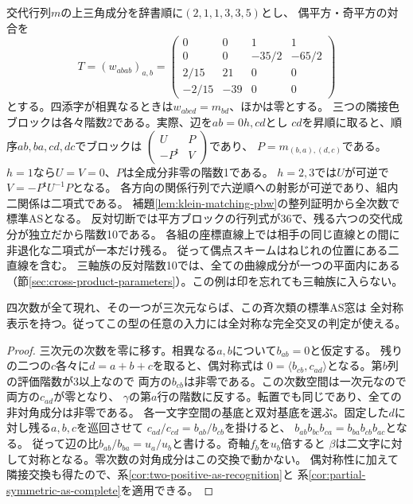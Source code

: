 \begin{proposition}[三軸族の外の反対階数10]\label{ex:klein-matched-rank-ten}
交代行列$m$の上三角成分を辞書順に$(2,1,1,3,3,5)$とし、
偶平方・奇平方の対合を
\[
 T=(w_{abab})_{a,b}=
 \begin{pmatrix}0&0&1&1\\0&0&-35/2&-65/2\\
 2/15&21&0&0\\-2/15&-39&0&0\end{pmatrix}
\]
とする。四添字が相異なるときは$w_{abcd}=m_{bd}$、ほかは零とする。
三つの隣接色ブロックは各々階数2である。実際、辺を$ab=0h,cd$とし
$cd$を昇順に取ると、順序$ab,ba,cd,dc$でブロックは
$\left(\begin{smallmatrix}U&P\\-P^{\mathsf t}&V\end{smallmatrix}\right)$であり、
$P=m_{(b,a),(d,c)}$である。$h=1$なら$U=V=0$、$P$は全成分非零の階数1である。
$h=2,3$では$U$が可逆で$V=-P^{\mathsf t}U^{-1}P$となる。
各方向の関係行列で六逆順への射影が可逆であり、組内二関係は二項式である。
補題\ref{lem:klein-matching-pbw}の整列証明から全次数で標準ASとなる。
反対切断では平方ブロックの行列式が36で、残る六つの交代成分が独立だから階数10である。
各組の座標直線上では相手の同じ直線との間に非退化な二項式が一本だけ残る。
従って偶点スキームはねじれの位置にある二直線を含む。
三軸族の反対階数10では、全ての曲線成分が一つの平面内にある
（節\ref{sec:cross-product-parameters}）。この例は印を忘れても三軸族に入らない。
\end{proposition}

\begin{proposition}\label{prop:klein-three-singletons}
四次数が全て現れ、その一つが三次元ならば、この斉次類の標準AS窓は
全対称表示を持つ。従ってこの型の任意の入力には全対称な完全交叉の判定が使える。
\end{proposition}
\begin{proof}
三次元の次数を零に移す。相異なる$a,b$について$b_{ab}=0$と仮定する。
残りの二つの$c$各々に$d=a+b+c$を取ると、偶対称式は
$0=\langle b_{cb},c_{ad}\rangle$となる。第$b$列の評価階数が3以上なので
両方の$b_{cb}$は非零である。この次数空間は一次元なので両方の$c_{ad}$が零となり、
$\gamma$の第$a$行の階数に反する。転置でも同じであり、全ての非対角成分は非零である。
各一文字空間の基底と双対基底を選ぶ。固定した$d$に対し残る$a,b,c$を巡回させて
$c_{ad}/c_{cd}=b_{ab}/b_{cb}$を掛けると、
$b_{ab}b_{bc}b_{ca}=b_{ba}b_{cb}b_{ac}$となる。
従って辺の比$b_{ab}/b_{ba}=u_a/u_b$と書ける。奇軸$f_b$を$u_b$倍すると
$\beta$は二文字に対して対称となる。零次数の対角成分はこの交換で動かない。
偶対称性に加えて隣接交換も得たので、系\ref{cor:two-positive-as-recognition}と
系\ref{cor:partial-symmetric-as-complete}を適用できる。
\end{proof}
